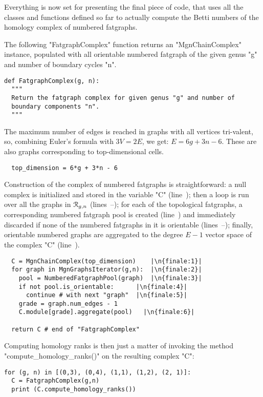 Everything is now set for presenting the final piece of code, that
uses all the classes and functions defined so far to actually compute
the Betti numbers of the homology complex of numbered fatgraphs.

The following "FatgraphComplex" function returns an "MgnChainComplex"
instance, populated with all orientable numbered fatgraph of the given
genus "g" and number of boundary cycles "n".  
\begin{lstlisting}
def FatgraphComplex(g, n):
  """
  Return the fatgraph complex for given genus "g" and number of
  boundary components "n".
  """
\end{lstlisting}
The maximum number of edges is reached in graphs with all vertices
tri-valent, so, combining Euler's formula with $3V = 2E$, we
get: $E = 6g + 3n - 6$.  These are also graphs corresponding
to top-dimensional cells.
\begin{lstlisting}
  top_dimension = 6*g + 3*n - 6

\end{lstlisting}
Construction of the complex of numbered fatgraphs is
straightforward: a null complex is initialized and stored in the
variable "C" (line~); then a loop is run over all the
graphs in $\mathcal{R}_{g,n}$ (lines~--); for each of
the topological fatgraphs, a corresponding numbered fatgraph pool is
created (line~) and immediately discarded if none of the
numbered fatgraphs in it is orientable
(lines~--); finally, orientable numbered
graphs are aggregated to the degree $E-1$ vector space of the complex
"C" (line~).
\begin{lstlisting}
  C = MgnChainComplex(top_dimension)    |\n{finale:1}|
  for graph in MgnGraphsIterator(g,n):  |\n{finale:2}|
    pool = NumberedFatgraphPool(graph)  |\n{finale:3}|
    if not pool.is_orientable:      |\n{finale:4}|
      continue # with next "graph"  |\n{finale:5}|
    grade = graph.num_edges - 1
    C.module[grade].aggregate(pool)   |\n{finale:6}|
    
  return C # end of "FatgraphComplex"
\end{lstlisting}

Computing homology ranks is then just a matter of invoking the method
"compute_homology_ranks()" on the resulting complex "C":
\begin{lstlisting}
for (g, n) in [(0,3), (0,4), (1,1), (1,2), (2, 1)]:
  C = FatgraphComplex(g,n)
  print (C.compute_homology_ranks())
\end{lstlisting}


